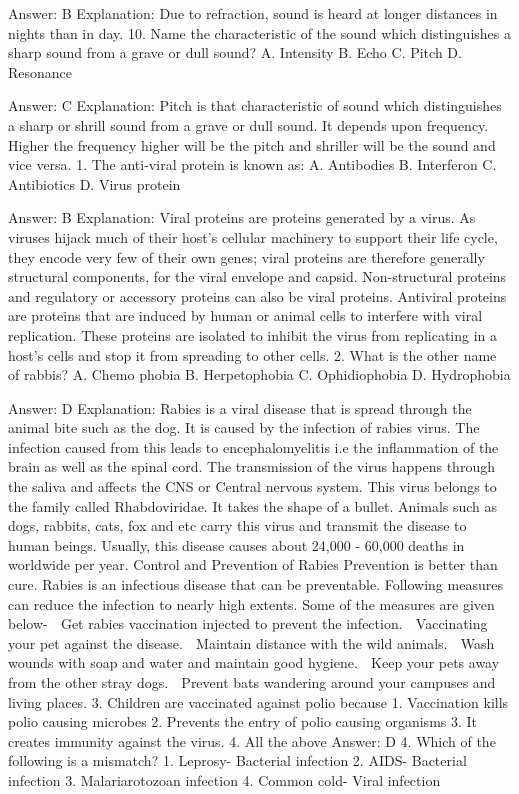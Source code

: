 Answer: B
Explanation: Due to refraction, sound is heard at longer distances in nights than in day. 10. Name the characteristic of the sound which distinguishes a sharp sound from a grave or dull sound? A. Intensity B. Echo C. Pitch D. Resonance 

Answer: C
Explanation: Pitch is that characteristic of sound which distinguishes a sharp or shrill sound from a grave or dull sound. It depends upon frequency. Higher the frequency higher will be the pitch and shriller will be the sound and vice versa. 1. The anti-viral protein is known as: A. Antibodies B. Interferon C. Antibiotics D. Virus protein 

Answer: B
Explanation: Viral proteins are proteins generated by a virus. As viruses hijack much of their host's cellular machinery to support their life cycle, they encode very few of their own genes; viral proteins are therefore generally structural components, for the viral envelope and capsid. Non-structural proteins and regulatory or accessory proteins can also be viral proteins. Antiviral proteins are proteins that are induced by human or animal cells to interfere with viral replication. These proteins are isolated to inhibit the virus from replicating in a host's cells and stop it from spreading to other cells. 2. What is the other name of rabbis? A. Chemo phobia B. Herpetophobia C. Ophidiophobia D. Hydrophobia 

Answer: D
Explanation: Rabies is a viral disease that is spread through the animal bite such as the dog. It is caused by the infection of rabies virus. The infection caused from this leads to encephalomyelitis i.e the inflammation of the brain as well as the spinal cord. The transmission of the virus happens through the saliva and affects the CNS or Central nervous system. This virus belongs to the family called Rhabdoviridae. It takes the shape of a bullet. Animals such as dogs, rabbits, cats, fox and etc carry this virus and transmit the disease to human beings. Usually, this disease causes about 24,000 - 60,000 deaths in worldwide per year. Control and Prevention of Rabies Prevention is better than cure. Rabies is an infectious disease that can be preventable. Following measures can reduce the infection to nearly high extents. Some of the measures are given below-  Get rabies vaccination injected to prevent the infection.  Vaccinating your pet against the disease.  Maintain distance with the wild animals.  Wash wounds with soap and water and maintain good hygiene.  Keep your pets away from the other stray dogs.  Prevent bats wandering around your campuses and living places. 3. Children are vaccinated against polio because 1. Vaccination kills polio causing microbes 2. Prevents the entry of polio causing organisms 3. It creates immunity against the virus. 4. All the above 
Answer: D 4. Which of the following is a mismatch? 1. Leprosy- Bacterial infection 2. AIDS- Bacterial infection 
3. Malariarotozoan infection 4. Common cold- Viral infection 

